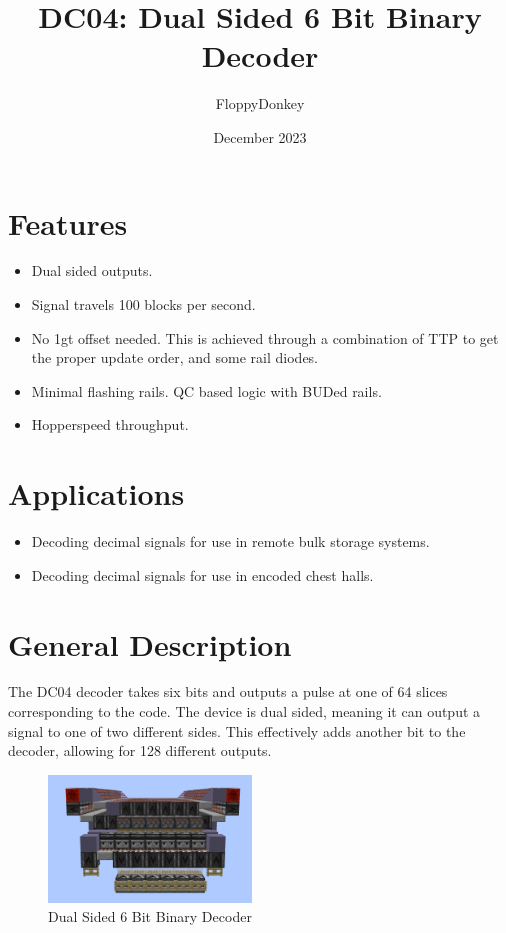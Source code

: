 \documentclass[10pt]{datasheet}
\title{DC04: Dual Sided 6 Bit Binary Decoder}
\author{FloppyDonkey}
\date{December 2023}
\begin{document}
\maketitle

\section{Features}

\begin{itemize}
\item{Dual sided outputs.}
\item{Signal travels 100 blocks per second.}
\item{No 1gt offset needed. This is achieved through a combination of TTP to get the proper update order, and some rail diodes.}
\item{Minimal flashing rails. QC based logic with BUDed rails.}
\item{Hopperspeed throughput.}
\end{itemize}

\section{Applications}

\begin{itemize}
\item{Decoding decimal signals for use in remote bulk storage systems.}
\item{Decoding decimal signals for use in encoded chest halls.}
\end{itemize}

\section{General Description}
The DC04 decoder takes six bits and outputs a pulse at one of 64 slices corresponding to the code. The device is dual sided, meaning it can output a signal to one of two different sides. This effectively adds another bit to the decoder, allowing for 128 different outputs.
\vfill\break

\begin{figure}[h]
    \centering
    \includegraphics[width=0.48\textwidth]{dualdecoder.png}
    \caption{\centering Dual Sided 6 Bit Binary Decoder}
\end{figure}
\end{document}
